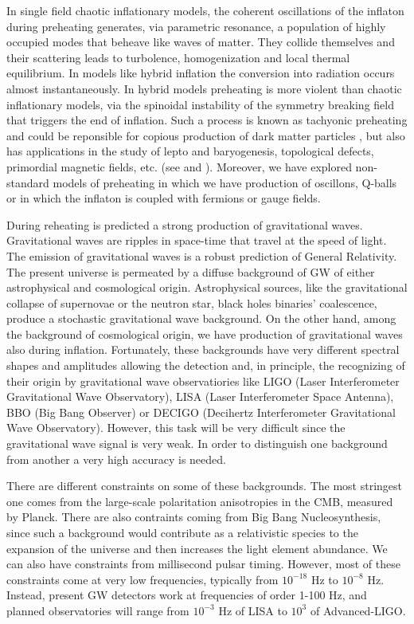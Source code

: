 \documentclass[11pt,a4paper,twoside]{book}
\begin{document}
In single field chaotic inflationary models, the coherent oscillations of the inflaton during preheating generates, via parametric resonance, a population of highly occupied modes that beheave like waves of matter. They collide themselves and their scattering leads to turbolence, homogenization and local thermal equilibrium. In models like hybrid inflation the conversion into radiation occurs almost instantaneously. In hybrid models preheating is more violent than chaotic inflationary models, via the spinoidal instability of the symmetry breaking field that triggers the end of inflation. Such a process is known as tachyonic preheating and could be reponsible for copious production of dark matter particles \cite{Conclusion:DarkMatter}, but also has applications in the study of lepto and baryogenesis, topological defects, primordial magnetic fields, etc. (see \cite{Chap4:AminHetrzberg} and \cite{Chap4:Lozanov}). Moreover, we have explored non-standard models of preheating in which we have production of oscillons, Q-balls or in which the inflaton is coupled with fermions or gauge fields.

During reheating is predicted a strong production of gravitational waves. Gravitational waves are ripples in space-time that travel at the speed of light. The emission of gravitational waves is a robust prediction of General Relativity. The present universe is permeated by a diffuse  background of GW of either astrophysical and cosmological origin. Astrophysical sources, like the gravitational collapse of supernovae or the  neutron star, black holes binaries' coalescence, produce a stochastic gravitational wave background. On the other hand, among the background of cosmological origin, we have production of gravitational waves also during inflation. Fortunately, these backgrounds have very different spectral shapes and amplitudes allowing the detection and, in principle, the recognizing of their origin by gravitational wave observatiories like LIGO (Laser Interferometer Gravitational Wave Observatory), LISA (Laser Interferometer Space Antenna), BBO (Big Bang Observer) or DECIGO (Decihertz Interferometer Gravitational Wave Observatory). However, this task will be very difficult since the gravitational wave signal is very weak. In order to distinguish one background from another a very high accuracy is needed.

There are different constraints on some of these backgrounds. The most stringest one comes from the large-scale polaritation anisotropies in the CMB, measured by Planck. There are also contraints coming from Big Bang Nucleosynthesis, since such a background would contribute as a relativistic species to the expansion of the universe and then increases the light element abundance. We can also have constraints from millisecond pulsar timing. However, most of these constraints come at very low frequencies, typically from $ 10^{-18} $ Hz to $ 10^{-8} $ Hz. Instead, present GW detectors work at frequencies of order 1-100 Hz, and planned observatories will range from $ 10^{-3} $ Hz of LISA to $ 10^{3} $ of Advanced-LIGO.
\end{document}
